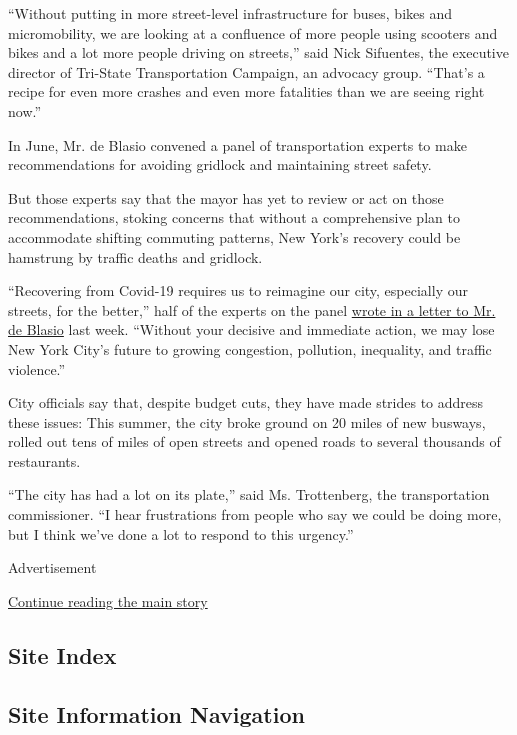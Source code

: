 ``Without putting in more street-level infrastructure for buses, bikes
and micromobility, we are looking at a confluence of more people using
scooters and bikes and a lot more people driving on streets,'' said Nick
Sifuentes, the executive director of Tri-State Transportation Campaign,
an advocacy group. ``That's a recipe for even more crashes and even more
fatalities than we are seeing right now.''

In June, Mr. de Blasio convened a panel of transportation experts to
make recommendations for avoiding gridlock and maintaining street
safety.

But those experts say that the mayor has yet to review or act on those
recommendations, stoking concerns that without a comprehensive plan to
accommodate shifting commuting patterns, New York's recovery could be
hamstrung by traffic deaths and gridlock.

``Recovering from Covid-19 requires us to reimagine our city, especially
our streets, for the better,'' half of the experts on the panel
\href{https://medium.com/@TransAlt/an-open-letter-to-mayor-de-blasio-from-the-surface-transportation-advisory-council-5a75ae2559ce?source=messageShare-e4ed91e3b0ac-1598967953\&_branch_match_id=618921677228910997}{wrote
in a letter to Mr. de Blasio} last week. ``Without your decisive and
immediate action, we may lose New York City's future to growing
congestion, pollution, inequality, and traffic violence.''

City officials say that, despite budget cuts, they have made strides to
address these issues: This summer, the city broke ground on 20 miles of
new busways, rolled out tens of miles of open streets and opened roads
to several thousands of restaurants.

``The city has had a lot on its plate,'' said Ms. Trottenberg, the
transportation commissioner. ``I hear frustrations from people who say
we could be doing more, but I think we've done a lot to respond to this
urgency.''

Advertisement

\protect\hyperlink{after-bottom}{Continue reading the main story}

\hypertarget{site-index}{%
\subsection{Site Index}\label{site-index}}

\hypertarget{site-information-navigation}{%
\subsection{Site Information
Navigation}\label{site-information-navigation}}

